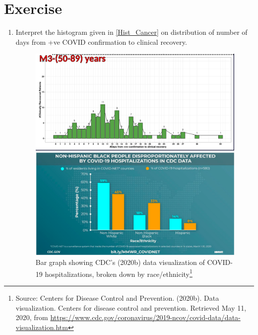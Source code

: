 \documentclass[a4paper, 11pt]{article}
\begin{document}
\section{Exercise}
%
	\begin{enumerate}[font=\bfseries]
		\item 
				Interpret the histogram given in \vref{Hist_Cancer} on distribution of number of days from +ve COVID confirmation to clinical recovery.
				\begin{figure}
					\begin{minipage}{\linewidth}
						\includegraphics[width=\linewidth]{Hist_Cancer.png}
						\caption{Histogram showing patient-count distribution of number of days from +ve COVID confirmation to clinical recovery in Singapore during January 23-April 01.\protect\footnote{Source: Sreevalsan-Nair, J., Vangimalla, R. R., \& Ghogale, P. R. (2020). Analysis of clinical recovery-period and recovery rate estimation of the first 1000 COVID-19 patients in Singapore. medRxiv}}
						\label{Hist_Cancer}\vspace{5ex}
						\includegraphics[width=\linewidth]{Bar_Cancer.png}
						\caption{Bar graph showing CDC’s (2020b) data visualization of COVID-19 hospitalizations, broken down by race/ethnicity\protect\footnote{Source: Centers for Disease Control and Prevention. (2020b). Data visualization. Centers for disease control and prevention. Retrieved May 11, 2020, from \url{https://www.cdc.gov/coronavirus/2019-ncov/covid-data/data-visualization.htm}}}

\end{minipage}
\end{figure}
\end{enumerate}
\end{document}
